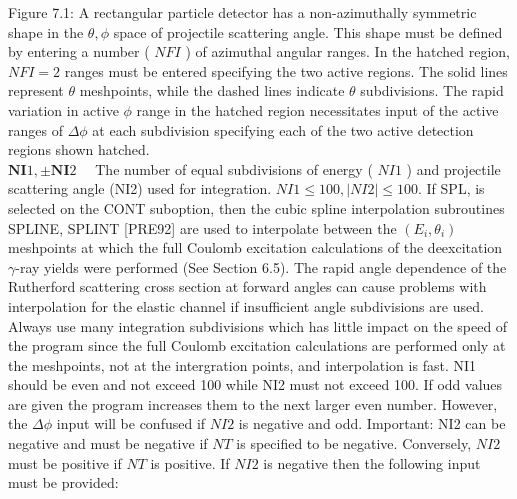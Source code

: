 \documentclass[10pt]{article}
\begin{document}
Figure 7.1: A rectangular particle detector has a non-azimuthally symmetric shape in the $\theta, \phi$ space of projectile scattering angle. This shape must be defined by entering a number ( $N F I$ ) of azimuthal angular ranges. In the hatched region, $N F I=2$ ranges must be entered specifying the two active regions. The solid lines represent $\theta$ meshpoints, while the dashed lines indicate $\theta$ subdivisions. The rapid variation in active $\phi$ range in the hatched region necessitates input of the active ranges of $\Delta \phi$ at each subdivision specifying each of the two active detection regions shown hatched.\\
$\mathbf{N I} 1, \pm \mathbf{N I} 2 \quad$ The number of equal subdivisions of energy ( $N I 1$ ) and projectile scattering angle (NI2) used for integration. $N I 1 \leq 100,|N I 2| \leq 100$. If SPL, is selected on the CONT suboption, then the cubic spline interpolation subroutines SPLINE, SPLINT [PRE92] are used to interpolate between the $\left(E_{i}, \theta_{i}\right)$ meshpoints at which the full Coulomb excitation calculations of the deexcitation $\gamma$-ray yields were performed (See Section 6.5). The rapid angle dependence of the Rutherford scattering cross section at forward angles can cause problems with interpolation for the elastic channel if insufficient angle subdivisions are used. Always use many integration subdivisions which has little impact on the speed of the program since the full Coulomb excitation calculations are performed only at the meshpoints, not at the intergration points, and interpolation is fast. NI1 should be even and not exceed 100 while NI2 must not exceed 100. If odd values are given the program increases them to the next larger even number. However, the $\Delta \phi$ input will be confused if $N I 2$ is negative and odd. Important: NI2 can be negative and must be negative if $N T$ is specified to be negative. Conversely, $N I 2$ must be positive if $N T$ is positive. If $N I 2$ is negative then the following input must be provided:\\
\end{document}
